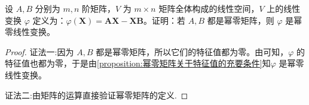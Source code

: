 \documentclass[../../main.tex]{subfiles}%
\begin{document}
\begin{example}
设 $A,B$ 分别为 $m,n$ 阶矩阵，$V$ 为 $m \times n$ 矩阵全体构成的线性空间，$V$ 上的线性变换 $\varphi$ 定义为：$\varphi(\boldsymbol{X}) = \boldsymbol{AX} - \boldsymbol{XB}$。证明：若 $A,B$ 都是幂零矩阵，则 $\varphi$ 是幂零线性变换。
\end{example}
\begin{proof}

{\color{blue}证法一:}因为 $A,B$ 都是幂零矩阵，所以它们的特征值都为零。由可知，$\varphi$ 的特征值也都为零，于是由\cref{proposition:幂零矩阵关于特征值的充要条件}知$\varphi$ 是幂零线性变换。

{\color{blue}证法二:}由矩阵的运算直接验证幂零矩阵的定义.
\end{proof}
\end{document}
